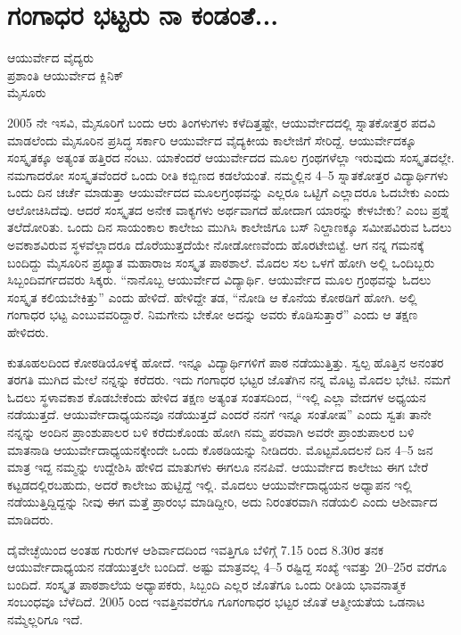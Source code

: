 \chapter{ಗಂಗಾಧರ ಭಟ್ಟರು ನಾ ಕಂಡಂತೆ...}

\begin{center}
\smallskip
ಆಯುರ್ವೇದ ವೈದ್ಯರು\\
ಪ್ರಶಾಂತಿ ಆಯುರ್ವೇದ ಕ್ಲಿನಿಕ್\\
ಮೈಸೂರು
\addrule
\end{center}
2005 ನೇ ಇಸವಿ, ಮೈಸೂರಿಗೆ ಬಂದು ಆರು ತಿಂಗಳುಗಳು ಕಳೆದಿತ್ತಷ್ಟೇ, ಆಯುರ್ವೇದದಲ್ಲಿ ಸ್ನಾತಕೋತ್ತರ ಪದವಿ ಮಾಡಲೆಂದು ಮೈಸೂರಿನ ಪ್ರಸಿದ್ಧ ಸರ್ಕಾರಿ ಆಯುರ್ವೇದ ವೈದ್ಯಕೀಯ ಕಾಲೇಜಿಗೆ ಸೇರಿದ್ದೆ. ಆಯುರ್ವೇದಕ್ಕೂ ಸಂಸ್ಕೃತಕ್ಕೂ ಅತ್ಯಂತ ಹತ್ತಿರದ ನಂಟು. ಯಾಕೆಂದರೆ ಆಯುರ್ವೇದದ ಮೂಲ ಗ್ರಂಥಗಳೆಲ್ಲಾ ಇರುವುದು ಸಂಸ್ಕೃತದಲ್ಲೇ. ನಮಗಾದರೋ ಸಂಸ್ಕೃತವೆಂದರೆ ಒಂದು ರೀತಿ ಕಬ್ಬಿಣದ ಕಡಲೆಯಂತೆ. ನಮ್ಮಲ್ಲಿನ 4–5 ಸ್ನಾತಕೋತ್ತರ ವಿದ್ಯಾರ್ಥಿಗಳು ಒಂದು ದಿನ ಚರ್ಚೆ ಮಾಡುತ್ತಾ ಆಯುರ್ವೇದದ ಮೂಲಗ್ರಂಥವನ್ನು ಎಲ್ಲರೂ ಒಟ್ಟಿಗೆ ಎಲ್ಲಾದರೂ ಓದಬೇಕು ಎಂದು ಆಲೋಚಿಸಿದೆವು. ಆದರೆ ಸಂಸ್ಕೃತದ ಅನೇಕ ವಾಕ್ಯಗಳು ಅರ್ಥವಾಗದೆ ಹೋದಾಗ ಯಾರನ್ನು ಕೇಳಬೇಕು? ಎಂಬ ಪ್ರಶ್ನೆ ತಲೆದೋರಿತು. ಒಂದು ದಿನ ಸಾಯಂಕಾಲ ಕಾಲೇಜು ಮುಗಿಸಿ ಕಾಲೇಜಿಗೂ ಬಸ್ ನಿಲ್ದಾಣಕ್ಕೂ ಸಮೀಪವಿರುವ ಓದಲು ಅವಕಾಶವಿರುವ ಸ್ಥಳವೆಲ್ಲಾದರೂ ದೊರೆಯುತ್ತದೆಯೇ ನೋಡೋಣವೆಂದು ಹೊರಟೇಬಿಟ್ಟೆ. ಆಗ ನನ್ನ ಗಮನಕ್ಕೆ ಬಂದಿದ್ದು ಮೈಸೂರಿನ ಪ್ರಖ್ಯಾತ ಮಹಾರಾಜ ಸಂಸ್ಕೃತ ಪಾಠಶಾಲೆ. ಮೊದಲ ಸಲ ಒಳಗೆ ಹೋಗಿ ಅಲ್ಲಿ ಒಂದಿಬ್ಬರು ಸಿಬ್ಬಂದಿವರ್ಗದವರು ಸಿಕ್ಕರು. “ನಾನೊಬ್ಬ ಆಯುರ್ವೇದ ವಿದ್ಯಾರ್ಥಿ. ಆಯುರ್ವೇದ ಮೂಲ ಗ್ರಂಥವನ್ನು ಓದಲು ಸಂಸ್ಕೃತ ಕಲಿಯಬೇಕಿತ್ತು” ಎಂದು ಹೇಳಿದೆ. ಹೇಳಿದ್ದೇ ತಡ,  “ನೋಡಿ ಆ ಕೊನೆಯ ಕೋಠಡಿಗೆ ಹೋಗಿ. ಅಲ್ಲಿ ಗಂಗಾಧರ ಭಟ್ಟ ಎಂಬುವವರಿದ್ದಾರೆ. ನಿಮಗೇನು ಬೇಕೋ ಅದನ್ನು ಅವರು ಕೊಡಿಸುತ್ತಾರೆ” ಎಂದು ಆ ತಕ್ಷಣ ಹೇಳಿದರು.

ಕುತೂಹಲದಿಂದ ಕೋಠಡಿಯೊಳಕ್ಕೆ ಹೋದೆ. ಇನ್ನೂ ವಿದ್ಯಾರ್ಥಿಗಳಿಗೆ ಪಾಠ ನಡೆಯುತ್ತಿತ್ತು. ಸ್ವಲ್ಪ ಹೊತ್ತಿನ  ಅನಂತರ ತರಗತಿ ಮುಗಿದ ಮೇಲೆ ನನ್ನನ್ನು ಕರೆದರು. ಇದು ಗಂಗಾಧರ ಭಟ್ಟರ ಜೊತೆಗಿನ ನನ್ನ ಮೊಟ್ಟ ಮೊದಲ ಭೇಟಿ. ನಮಗೆ ಓದಲು  ಸ್ಥಳಾವಕಾಶ ಕೊಡಬೇಕೆಂದು ಹೇಳಿದ ತಕ್ಷಣ ಅತ್ಯಂತ ಸಂತಸದಿಂದ, “ಇಲ್ಲಿ ಎಲ್ಲಾ ವೇದಗಳ ಅಧ್ಯಯನ ನಡೆಯುತ್ತದೆ. ಆಯುರ್ವೇದಾಧ್ಯಯನವೂ ನಡೆಯುತ್ತದೆ ಎಂದರೆ ನನಗೆ ಇನ್ನೂ ಸಂತೋಷ” ಎಂದು ಸ್ವತಃ ತಾನೇ ನನ್ನನ್ನು ಅಂದಿನ ಪ್ರಾಂಶುಪಾಲರ ಬಳಿ ಕರೆದುಕೊಂಡು ಹೋಗಿ ನಮ್ಮ ಪರವಾಗಿ ಅವರೇ ಪ್ರಾಂಶುಪಾಲರ ಬಳಿ ಮಾತನಾಡಿ ಆಯುರ್ವೇದಾಧ್ಯಯನಕ್ಕೇಂದೇ ಒಂದು ಕೊಠಡಿಯನ್ನು ನೀಡಿದರು. 
ಮೊಟ್ಟಮೊದಲನೆ ದಿನ 4–5 ಜನ ಮಾತ್ರ ಇದ್ದ ನಮ್ಮನ್ನು ಉದ್ದೇಶಿಸಿ ಹೇಳಿದ ಮಾತುಗಳು ಈಗಲೂ ನನಪಿವೆ. ಆಯುರ್ವೇದ ಕಾಲೇಜು ಈಗ ಬೇರೆ ಕಟ್ಟಡದಲ್ಲಿರಬಹುದು, ಅದರೆ ಕಾಲೇಜು ಹುಟ್ಟಿದ್ದೆ ಇಲ್ಲಿ. ಮೊದಲು ಆಯುರ್ವೇದಾಧ್ಯಯನ ಅಧ್ಯಾಪನ ಇಲ್ಲಿ ನಡೆಯುತ್ತಿದ್ದಿದ್ದನ್ನು ನೀವು ಈಗ ಮತ್ತೆ ಪ್ರಾರಂಭ ಮಾಡಿದ್ದೀರಿ, ಅದು ನಿರಂತರವಾಗಿ ನಡೆಯಲಿ ಎಂದು ಆಶೀರ್ವಾದ ಮಾಡಿದರು. 


ದೈವೇಚ್ಛೆಯಿಂದ ಅಂತಹ ಗುರುಗಳ ಆಶಿರ್ವಾದದಿಂದ ಇವತ್ತಿಗೂ ಬೆಳಿಗ್ಗೆ 7.15 ರಿಂದ 8.30ರ ತನಕ ಆಯುರ್ವೇದಾಧ್ಯಯನ ನಡೆಯುತ್ತಲೇ ಬಂದಿದೆ. ಅಷ್ಟು ಮಾತ್ರವಲ್ಲ 4–5 ರಷ್ಟಿದ್ದ ಸಂಖ್ಯೆ ಇವತ್ತು 20–25ರ ವರೆಗೂ ಬಂದಿದೆ. ಸಂಸ್ಕೃತ ಪಾಠಶಾಲೆಯ ಅಧ್ಯಾಪಕರು, ಸಿಬ್ಬಂದಿ ಎಲ್ಲರ ಜೊತೆಗೂ ಒಂದು ರೀತಿಯ ಭಾವನಾತ್ಮಕ ಸಂಬಂಧವೂ ಬೆಳೆದಿದೆ. 2005 ರಿಂದ ಇವತ್ತಿನವರೆಗೂ ಗೂಗಂಗಾಧರ ಭಟ್ಟರ ಜೊತೆ ಆತ್ಮೀಯತೆಯ ಒಡನಾಟ ನಮ್ಮೆಲ್ಲರಿಗೂ ಇದೆ.

